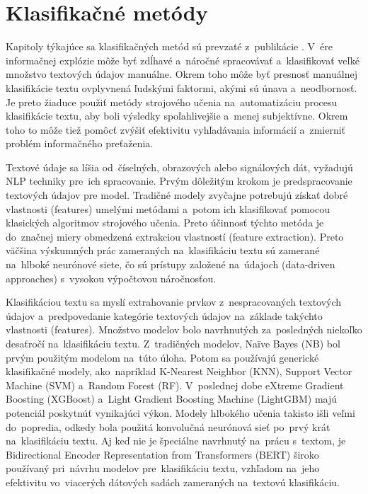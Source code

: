 \section{Klasifikačné metódy}
Kapitoly týkajúce sa klasifikačných metód sú prevzaté z~publikácie \cite{Li:2021}. V~ére informačnej explózie môže byť zdĺhavé a~náročné spracovávať a~klasifikovať veľké množstvo textových údajov manuálne. Okrem toho môže byť presnosť manuálnej klasifikácie textu ovplyvnená ľudskými faktormi, akými sú únava a~neodbornosť. Je preto žiaduce použiť metódy strojového učenia na~automatizáciu procesu klasifikácie textu, aby boli výsledky spoľahlivejšie a~menej subjektívne. Okrem toho to môže tiež pomôcť zvýšiť efektivitu vyhľadávania informácií a~zmierniť problém informačného preťaženia.

Textové údaje sa líšia od~číselných, obrazových alebo signálových dát, vyžadujú NLP   techniky pre~ich spracovanie. Prvým dôležitým krokom je predspracovanie textových údajov
pre model. Tradičné modely zvyčajne potrebujú získať dobré vlastnosti (features) umelými metódami a~potom ich klasifikovať pomocou klasických algoritmov strojového učenia. Preto účinnosť týchto metóda je do~značnej miery obmedzená extrakciou vlastností (feature extraction). Preto väčšina výskumných prác zameraných na~klasifikáciu textu sú zamerané na~hlboké neurónové siete, čo sú prístupy založené na~údajoch (data-driven approaches) s~vysokou výpočtovou náročnosťou.

Klasifikáciou textu sa myslí extrahovanie prvkov z~nespracovaných textových údajov a~predpovedanie kategórie textových údajov na~základe takýchto vlastnosti (features). Množstvo modelov bolo navrhnutých za~posledných niekoľko desaťročí na~klasifikáciu textu. Z~tradičných modelov, Naïve Bayes (NB) bol prvým použitým modelom na~túto úloha. Potom sa používajú generické klasifikačné modely, ako~napríklad K-Nearest Neighbor (KNN), Support Vector Machine (SVM) a~Random Forest (RF). V~poslednej dobe eXtreme Gradient Boosting (XGBoost) a~Light Gradient Boosting Machine (LightGBM) majú potenciál poskytnúť vynikajúci výkon. Modely hlbokého učenia takisto išli veľmi do~popredia, odkedy bola použitá konvolučná neurónová sieť po~prvý krát na~klasifikáciu textu. Aj keď nie je špeciálne navrhnutý na~prácu s~textom, je Bidirectional Encoder Representation from Transformers (BERT) široko používaný pri~návrhu modelov pre~klasifikáciu textu, vzhľadom na~jeho efektivitu vo~viacerých dátových sadách zameraných na~textovú klasifikáciu.

